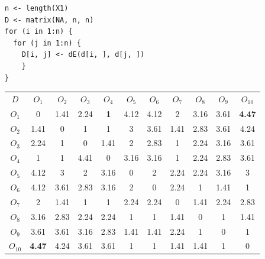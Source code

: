 \begin{lstlisting}
n <- length(X1)
D <- matrix(NA, n, n)
for (i in 1:n) {
  for (j in 1:n) {
    D[i, j] <- dE(d[i, ], d[j, ])
    } 
}
\end{lstlisting}
\begin{center}
\begin{tabular}{c|cccccccccc}
$D$ & $O_{1}$ & $O_2$ & $O_3$ & $O_4$ & $O_5$ & $O_6$ & $O_7$ & $O_8$ & $O_9$ & $O_{10}$ \\
$O_1$ & 0 & 1.41 & 2.24 & \textbf{1} & 4.12 & 4.12 & 2 & 3.16 & 3.61 & \textbf{4.47} \\
$O_2$ & 1.41 & 0 & 1 & 1 & 3 & 3.61 & 1.41 & 2.83 & 3.61 & 4.24 \\
$O_3$ & 2.24 & 1 & 0 & 1.41 & 2 & 2.83 & 1 & 2.24 & 3.16 & 3.61 \\
$O_4$ & 1 & 1 & 4.41 & 0 & 3.16 & 3.16 & 1 & 2.24 & 2.83 & 3.61 \\
$O_5$ & 4.12 & 3 & 2 & 3.16 & 0 & 2 & 2.24 & 2.24 & 3.16 & 3 \\
$O_6$ & 4.12 & 3.61 & 2.83 & 3.16 & 2 & 0 & 2.24 & 1 & 1.41 & 1 \\
$O_7$ & 2 & 1.41 & 1 & 1 & 2.24 & 2.24 & 0 & 1.41 & 2.24 & 2.83 \\
$O_8$ & 3.16 & 2.83 & 2.24 & 2.24 & 1 & 1 & 1.41 & 0 & 1 & 1.41 \\
$O_9$ & 3.61 & 3.61 & 3.16 & 2.83 & 1.41 & 1.41 & 2.24 & 1 & 0 & 1 \\
$O_{10}$ & \textbf{4.47} & 4.24 & 3.61 & 3.61 & 1 & 1 & 1.41 & 1.41 & 1 & 0 \\
\hline
\end{tabular}
\end{center}